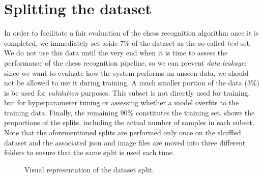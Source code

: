 \documentclass[../report.tex]{subfiles}
\begin{document}
\section{Splitting the dataset}
\label{sec:split_dataset}
In order to facilitate a fair evaluation of the chess recognition algorithm once it is completed, we immediately set aside 7\% of the dataset as the so-called \emph{test} set.
We do not use this data until the very end when it is time to assess the performance of the chess recognition pipeline, so we can prevent \emph{data leakage}: since we want to evaluate how the system performs on unseen data, we should not be allowed to use it during training.
A much smaller portion of the data (3\%) is be used for \emph{validation} purposes.
This subset is not directly used for training, but for hyperparameter tuning or assessing whether a model overfits to the training data.
Finally, the remaining 90\% constitutes the training set.
 shows the proportions of the splits, including the actual number of samples in each subset.
Note that the aforementioned splits are performed only once on the shuffled dataset and the associated \gls{json} and image files are moved into three different folders to ensure that the same split is used each time.

\begin{figure}
    \caption{Visual representation of the dataset split.}
    \label{fig:dataset_split}
\end{figure}
\end{document}
